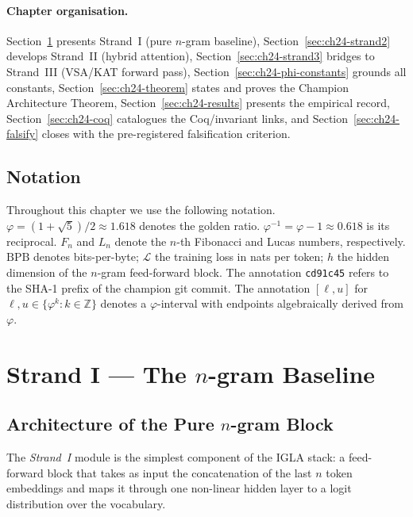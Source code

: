 \paragraph{Chapter organisation.}
Section~\ref{sec:ch24-strand1} presents Strand~I (pure $n$-gram baseline),
Section~\ref{sec:ch24-strand2} develops Strand~II (hybrid attention),
Section~\ref{sec:ch24-strand3} bridges to Strand~III (VSA/KAT forward pass),
Section~\ref{sec:ch24-phi-constants} grounds all constants,
Section~\ref{sec:ch24-theorem} states and proves the Champion Architecture
Theorem, Section~\ref{sec:ch24-results} presents the empirical record,
Section~\ref{sec:ch24-coq} catalogues the Coq/invariant links, and
Section~\ref{sec:ch24-falsify} closes with the pre-registered falsification
criterion.

\subsection{Notation}
\label{subsec:ch24-notation}

Throughout this chapter we use the following notation.
$\varphi = (1 + \sqrt{5})/2 \approx 1.618$ denotes the golden ratio.
$\varphi^{-1} = \varphi - 1 \approx 0.618$ is its reciprocal.
$F_n$ and $L_n$ denote the $n$-th Fibonacci and Lucas numbers, respectively.
$\mathrm{BPB}$ denotes bits-per-byte; $\mathcal{L}$ the training loss in nats
per token; $h$ the hidden dimension of the $n$-gram feed-forward block.
The annotation \texttt{cd91c45} refers to the SHA-1 prefix of the champion git
commit.  The annotation $[\ell, u]$ for $\ell, u \in \{\varphi^k : k \in \mathbb{Z}\}$
denotes a $\varphi$-interval with endpoints algebraically derived from $\varphi$.

\section{Strand I --- The \texorpdfstring{$n$}{n}-gram Baseline}
\label{sec:ch24-strand1}

\subsection{Architecture of the Pure \texorpdfstring{$n$}{n}-gram Block}
\label{subsec:ch24-ngram-arch}

The \emph{Strand~I} module is the simplest component of the IGLA stack: a
feed-forward block that takes as input the concatenation of the last $n$ token
embeddings and maps it through one non-linear hidden layer to a logit
distribution over the vocabulary.

